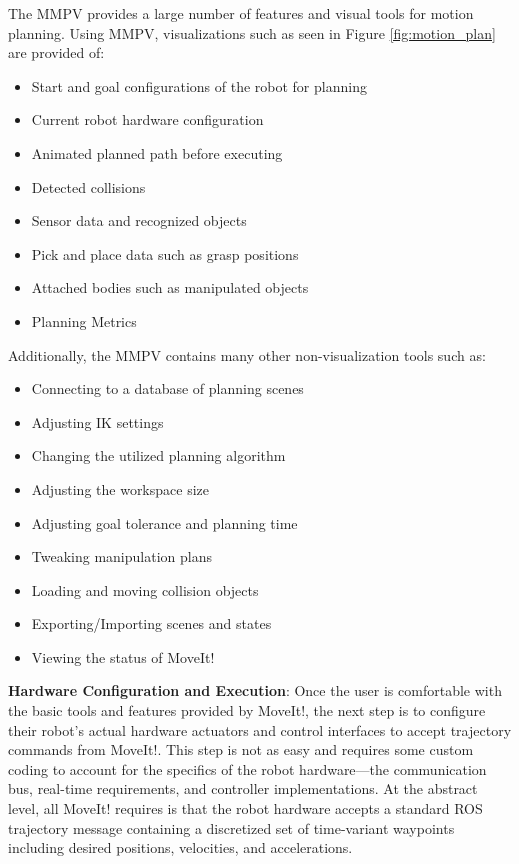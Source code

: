 \documentclass[10pt,journal,compsoc]{joser1}
\begin{document}
{The MMPV provides a large number of features and visual tools for motion planning. Using MMPV, visualizations such as seen in Figure \ref{fig:motion_plan} are provided of:

\begin{itemize}
    \item Start and goal configurations of the robot for planning
    \item Current robot hardware configuration
    \item Animated planned path before executing
    \item Detected collisions
    \item Sensor data and recognized objects
    \item Pick and place data such as grasp positions
    \item Attached bodies such as manipulated objects
    \item Planning Metrics
\end{itemize}

Additionally, the MMPV contains many other non-visualization tools such as:
\begin{itemize}
    \item Connecting to a database of planning scenes
    \item Adjusting IK settings
    \item Changing the utilized planning algorithm
    \item Adjusting the workspace size
    \item Adjusting goal tolerance and planning time
    \item Tweaking manipulation plans
    \item Loading and moving collision objects
    \item Exporting/Importing scenes and states
    \item Viewing the status of MoveIt!
\end{itemize}

{\bf Hardware Configuration and Execution}: Once the user is comfortable with the basic tools and features provided by MoveIt!, the next step is to configure their robot's actual hardware actuators and control interfaces to accept trajectory commands from MoveIt!. This step is not as easy and requires some custom coding to account for the specifics of the robot hardware---the communication bus, real-time requirements, and controller implementations. At the abstract level, all MoveIt! requires is that the robot hardware accepts a standard ROS trajectory message containing a discretized set of time-variant waypoints including desired positions, velocities, and accelerations.  

}
\end{document}
